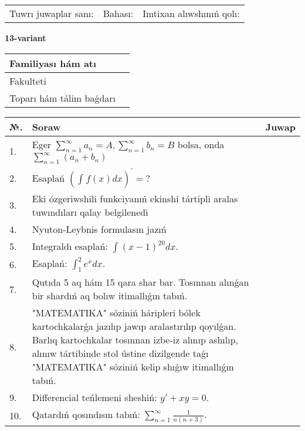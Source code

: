 \documentclass{article}
\begin{document}
\vspace{1cm}

\begin{tabular}{ c c c }
Tuwrı juwaplar sanı: \underline{\hspace{2cm}} & Bahası: \underline{\hspace{2cm}} & Imtixan alıwshınıń qolı: \underline{\hspace{2cm}} \\
\end{tabular}

\newpage

\begin{center}\textbf{13-variant}\end{center}

\bgroup
\def\arraystretch{1.5}
\begin{tabular}{ |m{6cm}|m{10cm}| }
  \hline
  Familiyası hám atı & \\
  \hline
  Fakulteti &\\
  \hline
  Toparı hám tálim baǵdarı & \\
  \hline
\end{tabular}
\egroup

\vspace{0.5cm}

\bgroup
\def\arraystretch{2}
\begin{tabular}{ |l|m{8cm}|m{7cm}| }
  \hline
  №. & Soraw & Juwap \\
  \hline
  1. & Eger $\displaystyle\sum_{n = 1}^{\infty}a_{n} = A, \sum_{n = 1}^{\infty}b_{n} = B$ bolsa, onda $\displaystyle\sum_{n = 1}^{\infty}\left( a_{n} + b_{n} \right)$ &  \\
  \hline
  2. & Esaplań $\displaystyle \left( \int_{}^{}{f(x)dx} \right)^\prime = ?$ &  \\
  \hline
  3. & Eki ózgeriwshili funkciyanıń ekinshi tártipli aralas tuwındıları qalay belgilenedi &  \\
  \hline
  4. & Nyuton-Leybnis formulasın jazıń &  \\
  \hline
  5. & Integraldı esaplań: $\displaystyle\int (x - 1)^{20}dx$. &  \\
  \hline
  6. & Esaplań: $\displaystyle\int_{1}^{2}{e^{x}dx}$. &  \\
  \hline
  7. & Qutıda 5 aq hám 15 qara shar bar. Tosınnan alınǵan bir shardıń aq bolıw itimallıǵın tabıń. &  \\
  \hline
  8. & "MATEMATIKA" sóziniń háripleri bólek kartochkalarǵa jazılıp jawıp aralastırılıp qoyılǵan. Barlıq kartochkalar tosınnan izbe-iz alınıp ashılıp, alınıw tártibinde stol ústine dizilgende taǵı "MATEMATIKA" sóziniń kelip shıǵıw itimallıǵın tabıń. &  \\
  \hline
  9. & Differencial teńlemeni sheshiń: $y' + xy = 0$. &  \\
  \hline
  10. & Qatardıń qosındısın tabıń: $\displaystyle\sum_{n = 1}^{\infty}\frac{1}{n(n + 3)}$. &  \\
  \hline
\end{tabular}
\egroup
\end{document}
